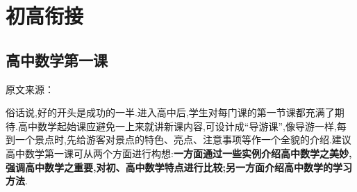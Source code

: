 \chapter*{初高衔接}
\section{高中数学第一课}
\begin{center}
	原文来源：\citet{JiangGaoZhongShuXueDiYiKeDeJiaoXueGouXiang2016}
\end{center}

俗话说,好的开头是成功的一半.进入高中后,学生对每门课的第一节课都充满了期待.高中数学起始课应避免一上来就讲新课内容,可设计成“导游课”,像导游一样,每到一个景点时,先给游客对景点的特色、亮点、注意事项等作一个全貌的介绍.建议高中数学第一课可从两个方面进行构想:\textbf{一方面通过一些实例介绍高中数学之美妙,强调高中数学之重要,对初、高中数学特点进行比较;另一方面介绍高中数学的学习方法}.

